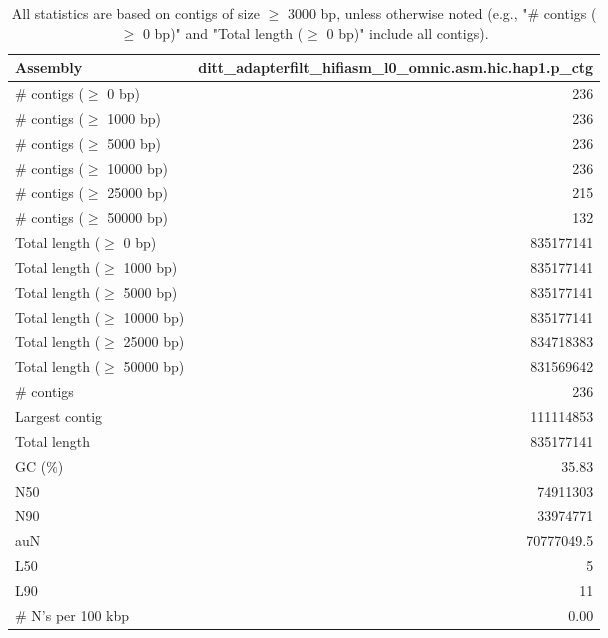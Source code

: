 \documentclass[12pt,a4paper]{article}
\begin{document}
\begin{table}[ht]
\begin{center}
\caption{All statistics are based on contigs of size $\geq$ 3000 bp, unless otherwise noted (e.g., "\# contigs ($\geq$ 0 bp)" and "Total length ($\geq$ 0 bp)" include all contigs).}
\begin{tabular}{|l*{1}{|r}|}
\hline
Assembly & ditt\_adapterfilt\_hifiasm\_l0\_omnic.asm.hic.hap1.p\_ctg \\ \hline
\# contigs ($\geq$ 0 bp) & 236 \\ \hline
\# contigs ($\geq$ 1000 bp) & 236 \\ \hline
\# contigs ($\geq$ 5000 bp) & 236 \\ \hline
\# contigs ($\geq$ 10000 bp) & 236 \\ \hline
\# contigs ($\geq$ 25000 bp) & 215 \\ \hline
\# contigs ($\geq$ 50000 bp) & 132 \\ \hline
Total length ($\geq$ 0 bp) & 835177141 \\ \hline
Total length ($\geq$ 1000 bp) & 835177141 \\ \hline
Total length ($\geq$ 5000 bp) & 835177141 \\ \hline
Total length ($\geq$ 10000 bp) & 835177141 \\ \hline
Total length ($\geq$ 25000 bp) & 834718383 \\ \hline
Total length ($\geq$ 50000 bp) & 831569642 \\ \hline
\# contigs & 236 \\ \hline
Largest contig & 111114853 \\ \hline
Total length & 835177141 \\ \hline
GC (\%) & 35.83 \\ \hline
N50 & 74911303 \\ \hline
N90 & 33974771 \\ \hline
auN & 70777049.5 \\ \hline
L50 & 5 \\ \hline
L90 & 11 \\ \hline
\# N's per 100 kbp & 0.00 \\ \hline
\end{tabular}
\end{center}
\end{table}
\end{document}
